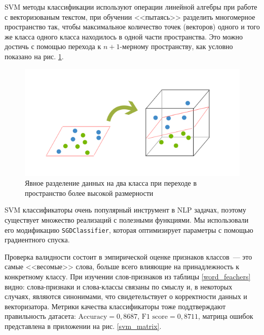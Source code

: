 \documentclass[a4paper, 14pt]{extarticle}
\begin{document}
SVM методы классификации используют операции линейной алгебры при работе с векторизованым текстом, при обучении <<пытаясь>> разделить многомерное пространство так, чтобы максимальное количество точек  (векторов) одного и того же класса одного класса находилось в одной части пространства. Это можно достичь с помощью перехода к $n+1$-мерному пространству, как условно показано на рис. \ref{svm_cond}.

\begin{figure}[h!]
	\centering
	\includegraphics[scale=0.6]{svm_cond}
	\caption{Явное разделение данных на два класса при переходе в пространство более высокой размерности}
	\label{svm_cond}
\end{figure}

SVM классификаторы очень популярный инструмент в NLP задачах, поэтому существует множество реализаций с полезными функциями. Мы использовали его модификацию \verb+SGDClassifier+, которая оптимизирует параметры с помощью градиентного спуска.

Проверка валидности состоит в эмпирической оценке признаков классов~--- это самые <<весомые>> слова, больше всего влияющие на принадлежность к конкретному классу. При изучении слов-признаков из таблицы \ref{word_feachers} видно: слова-признаки и слова-классы связаны по смыслу и, в некоторых случаях, являются синонимами, что свидетельствует о корректности данных и векторизатора. Метрики качества классификаторы тоже поддтверждают правильность датасета: $\text{Accuracy} = 0,8687$, $\text{F1 score} = 0,8711$, матрица ошибок представлена в приложении на рис. \ref{svm_matrix}.
\end{document}

